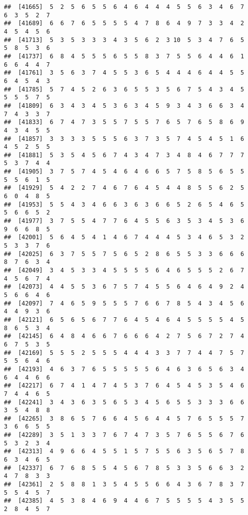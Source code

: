 \documentclass[
]{book}
\begin{document}
\begin{verbatim}
##  [41665]  5  2  5  6  5  5  6  4  6  4  4  4  5  5  6  3  4  6  7  6  3  5  2  7
##  [41689]  6  6  7  6  5  5  5  5  4  7  8  6  4  9  7  3  3  4  2  4  5  4  5  6
##  [41713]  5  3  5  3  3  3  4  3  5  6  2  3 10  5  3  4  7  6  5  5  8  5  3  6
##  [41737]  6  8  4  5  5  5  6  5  5  8  3  7  5  5  6  4  4  6  1  6  6  4  4  7
##  [41761]  3  5  6  3  7  4  5  5  3  6  5  4  4  4  6  4  4  5  5  6  4  5  4  3
##  [41785]  5  7  4  5  2  6  3  6  5  5  3  5  6  7  5  4  3  4  5  5  5  5  7  5
##  [41809]  6  3  4  3  4  5  3  6  3  4  5  9  3  4  3  6  6  3  4  7  4  3  3  7
##  [41833]  6  7  4  7  3  5  5  7  5  5  7  6  5  7  6  5  8  6  9  4  3  4  5  5
##  [41857]  3  3  3  3  5  5  5  6  3  7  3  5  7  4  5  4  5  1  6  4  5  2  5  5
##  [41881]  5  3  5  4  5  6  7  4  3  4  7  3  4  8  4  6  7  7  7  5  3  7  4  4
##  [41905]  3  7  5  7  4  5  4  6  4  6  6  5  7  5  8  5  6  5  5  5  5  6  1  5
##  [41929]  5  4  2  2  7  4  6  7  6  4  5  4  4  8  5  5  6  2  5  6  0  4  8  5
##  [41953]  5  5  4  3  4  6  6  3  6  3  6  6  5  2  6  5  4  6  5  5  6  6  5  2
##  [41977]  3  7  5  5  4  7  7  6  4  5  5  6  3  5  3  4  5  3  6  9  6  6  8  5
##  [42001]  5  6  4  5  4  1  4  6  7  4  4  4  5  3  4  6  5  3  2  5  3  3  7  6
##  [42025]  6  3  7  5  5  7  5  6  5  2  8  6  5  5  3  3  6  6  6  8  7  6  3  4
##  [42049]  3  4  5  3  3  4  5  5  5  5  6  4  6  5  5  5  2  6  7  4  5  6  7  4
##  [42073]  4  4  5  5  3  6  7  5  7  4  5  5  6  4  6  4  9  2  4  5  6  6  4  6
##  [42097]  7  4  6  5  9  5  5  5  7  6  6  7  8  5  4  3  4  5  6  4  4  9  3  6
##  [42121]  6  5  6  5  6  7  7  6  4  5  4  6  4  5  5  5  5  4  5  8  6  5  3  4
##  [42145]  6  4  8  4  6  6  7  6  6  6  4  2  7  5  6  7  2  7  4  6  7  5  3  5
##  [42169]  5  5  5  2  5  5  5  4  4  4  3  3  7  7  4  4  7  5  7  5  5  6  4  6
##  [42193]  4  6  3  7  6  5  5  5  5  5  6  4  6  3  6  5  6  3  4  6  4  4  6  6
##  [42217]  6  7  4  1  4  7  4  5  3  7  6  4  5  4  5  3  5  4  6  7  4  4  6  5
##  [42241]  3  4  3  6  3  5  6  5  3  4  5  6  5  5  3  3  3  6  6  3  5  4  8  8
##  [42265]  3  8  6  5  7  6  6  4  5  6  4  4  5  7  6  5  5  5  7  3  6  6  5  5
##  [42289]  3  5  1  3  3  7  6  7  4  7  3  5  7  6  5  5  6  7  6  5  3  2  3  4
##  [42313]  4  9  6  6  4  5  5  1  5  7  5  5  6  3  5  6  5  7  8  6  3  4  6  5
##  [42337]  6  7  6  8  5  5  4  5  6  7  8  5  3  3  5  6  6  3  2  4  7  8  3  3
##  [42361]  2  5  8  8  1  3  5  4  5  5  6  6  4  3  6  7  8  3  7  5  5  4  5  7
##  [42385]  4  5  3  8  4  6  9  4  4  6  7  5  5  5  5  4  3  5  5  2  8  4  5  7

\end{verbatim}
\end{document}
